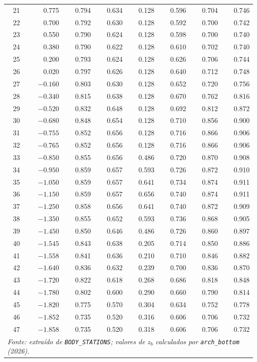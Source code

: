 \begin{longtable}{rrrrrrrr}
21 & 0.775 & 0.794 & 0.634 & 0.128 & 0.596 & 0.704 & 0.746 \\
22 & 0.700 & 0.792 & 0.630 & 0.128 & 0.592 & 0.700 & 0.742 \\
23 & 0.550 & 0.790 & 0.624 & 0.128 & 0.598 & 0.700 & 0.740 \\
24 & 0.380 & 0.790 & 0.622 & 0.128 & 0.610 & 0.702 & 0.740 \\
25 & 0.200 & 0.793 & 0.624 & 0.128 & 0.626 & 0.706 & 0.744 \\
26 & 0.020 & 0.797 & 0.626 & 0.128 & 0.640 & 0.712 & 0.748 \\
27 & $-0.160$ & 0.803 & 0.630 & 0.128 & 0.652 & 0.720 & 0.756 \\
28 & $-0.340$ & 0.815 & 0.638 & 0.128 & 0.670 & 0.762 & 0.816 \\
29 & $-0.520$ & 0.832 & 0.648 & 0.128 & 0.692 & 0.812 & 0.872 \\
30 & $-0.680$ & 0.848 & 0.654 & 0.128 & 0.710 & 0.856 & 0.900 \\
31 & $-0.755$ & 0.852 & 0.656 & 0.128 & 0.716 & 0.866 & 0.906 \\
32 & $-0.765$ & 0.852 & 0.656 & 0.128 & 0.716 & 0.866 & 0.906 \\
33 & $-0.850$ & 0.855 & 0.656 & 0.486 & 0.720 & 0.870 & 0.908 \\
34 & $-0.950$ & 0.859 & 0.657 & 0.593 & 0.726 & 0.872 & 0.910 \\
35 & $-1.050$ & 0.859 & 0.657 & 0.641 & 0.734 & 0.874 & 0.911 \\
36 & $-1.150$ & 0.859 & 0.657 & 0.656 & 0.740 & 0.874 & 0.911 \\
37 & $-1.250$ & 0.858 & 0.656 & 0.641 & 0.740 & 0.872 & 0.909 \\
38 & $-1.350$ & 0.855 & 0.652 & 0.593 & 0.736 & 0.868 & 0.905 \\
39 & $-1.450$ & 0.850 & 0.646 & 0.486 & 0.726 & 0.860 & 0.897 \\
40 & $-1.545$ & 0.843 & 0.638 & 0.205 & 0.714 & 0.850 & 0.886 \\
41 & $-1.558$ & 0.841 & 0.636 & 0.210 & 0.710 & 0.846 & 0.882 \\
42 & $-1.640$ & 0.836 & 0.632 & 0.239 & 0.700 & 0.836 & 0.870 \\
43 & $-1.720$ & 0.822 & 0.618 & 0.268 & 0.686 & 0.818 & 0.848 \\
44 & $-1.780$ & 0.802 & 0.600 & 0.290 & 0.660 & 0.790 & 0.814 \\
45 & $-1.820$ & 0.775 & 0.570 & 0.304 & 0.634 & 0.752 & 0.778 \\
46 & $-1.852$ & 0.735 & 0.520 & 0.316 & 0.606 & 0.706 & 0.732 \\
47 & $-1.858$ & 0.735 & 0.520 & 0.318 & 0.606 & 0.706 & 0.732 \\
\bottomrule
\multicolumn{8}{l}{\footnotesize\itshape Fonte: extra\'ido de \texttt{BODY\_STATIONS};
valores de $z_b$ calculados por \texttt{arch\_bottom} (2026).} \\
\end{longtable}
